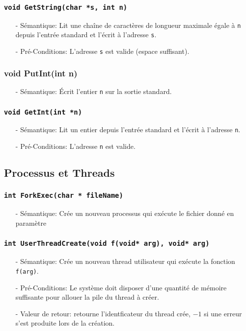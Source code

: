 \documentclass[11pt]{article}
\begin{document}
\subsubsection{\texttt{void GetString(char *s, int n)}}
\begin{itemize}
\item[-] Sémantique:
  Lit une chaîne de caractères de longueur maximale égale à \texttt{n} depuis l'entrée standard et
  l'écrit à l'adresse \texttt{s}.
\item[-] Pré-Conditions: L'adresse \texttt{s} est valide (espace suffisant).
\end{itemize}

\subsubsection{void PutInt(int n)}
\begin{itemize}
\item[-] Sémantique: Écrit l'entier \texttt{n} sur la sortie standard.
\end{itemize}

\subsubsection{\texttt{void GetInt(int *n)}}
\begin{itemize}
\item[-] Sémantique: Lit un entier depuis l'entrée standard et l'écrit à l'adresse \texttt{n}.
\item[-] Pré-Conditions: L'adresse \texttt{n} est valide.
\end{itemize}

\subsection{Processus et Threads}

\subsubsection{\texttt{int ForkExec(char * fileName)}}
 \begin{itemize}
 \item[-] Sémantique: Crée un nouveau processus qui exécute le fichier donné en paramètre
 \end{itemize}

\subsubsection{\texttt{int UserThreadCreate(void f(void* arg), void* arg)}}
\begin{itemize}
\item[-] Sémantique: Crée un nouveau thread utilisateur qui exécute la fonction \texttt{f(arg)}.
\item[-] Pré-Conditions: Le système doit disposer d'une quantité de mémoire suffisante pour allouer la
  pile du thread à créer. 
\item[-] Valeur de retour: retourne l'identficateur du thread crée, $-1$ si une erreur s'est produite lors de
  la création.
\end{itemize}
\end{document}

